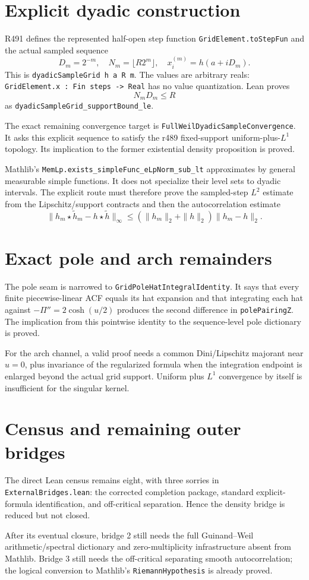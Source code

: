 \documentclass[11pt]{article}
\newcommand{\code}[1]{\nolinkurl{#1}}
\begin{document}
\section{Explicit dyadic construction}

R491 defines the represented half-open step function
\code{GridElement.toStepFun} and the actual sampled sequence
\[
 D_m=2^{-m},\quad N_m=\lfloor R2^m\rfloor,\quad
 x_i^{(m)}=h(a+iD_m).
\]
This is \code{dyadicSampleGrid h a R m}.  The values are arbitrary
reals: \code{GridElement.x : Fin steps -> Real} has no value
quantization.  Lean proves
\[
N_mD_m\le R
\]
as \code{dyadicSampleGrid_supportBound_le}.

The exact remaining convergence target is
\code{FullWeilDyadicSampleConvergence}.  It asks this explicit sequence
to satisfy the r489 fixed-support uniform-plus-\(L^1\) topology.
Its implication to the former existential density proposition is
proved.

Mathlib's \code{MemLp.exists_simpleFunc_eLpNorm_sub_lt}
approximates by general measurable simple functions.  It does not
specialize their level sets to dyadic intervals.  The explicit route
must therefore prove the sampled-step \(L^2\) estimate from the
Lipschitz/support contracts and then the autocorrelation estimate
\[
\|h_m\star\widetilde h_m-h\star\widetilde h\|_\infty
\le(\|h_m\|_2+\|h\|_2)\|h_m-h\|_2.
\]

\section{Exact pole and arch remainders}

The pole seam is narrowed to
\code{GridPoleHatIntegralIdentity}.  It says that every finite
piecewise-linear ACF equals its hat expansion and that integrating
each hat against \(-\Pi''=2\cosh(u/2)\) produces the second difference
in \code{polePairingZ}.  The implication from this pointwise identity
to the sequence-level pole dictionary is proved.

For the arch channel, a valid proof needs a common Dini/Lipschitz
majorant near \(u=0\), plus invariance of the regularized formula when
the integration endpoint is enlarged beyond the actual grid support.
Uniform plus \(L^1\) convergence by itself is insufficient for the
singular kernel.

\section{Census and remaining outer bridges}

The direct Lean census remains eight, with three sorries in
\code{ExternalBridges.lean}: the corrected completion package,
standard explicit-formula identification, and off-critical
separation.  Hence the density bridge is reduced but not closed.

After its eventual closure, bridge 2 still needs the full
Guinand--Weil arithmetic/spectral dictionary and zero-multiplicity
infrastructure absent from Mathlib.  Bridge 3 still needs the
off-critical separating smooth autocorrelation; the logical
conversion to Mathlib's \code{RiemannHypothesis} is already proved.
\end{document}
